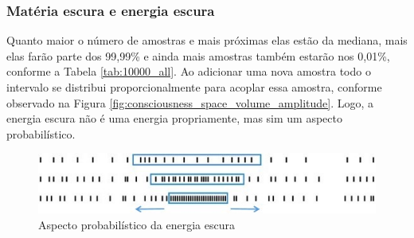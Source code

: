 \subsubsection{Matéria escura e energia escura}
Quanto maior o número de amostras e mais próximas elas estão da mediana, mais elas farão parte dos 99,99\% e ainda mais amostras também estarão nos 0,01\%, conforme a Tabela \ref{tab:10000_all}. Ao adicionar uma nova amostra todo o intervalo se distribui proporcionalmente para acoplar essa amostra, conforme observado na Figura \ref{fig:consciousness_space_volume_amplitude}. Logo, a energia escura não é uma energia propriamente, mas sim um aspecto probabilístico.
	\begin{figure}[H]
	\caption{Aspecto probabilístico da energia escura}
	\label{fig:consciousness_dark_matter_dark_energy}
	\centering
	\includegraphics[scale=.9]{sections/images/consciousness_dark_matter_dark_energy.jpg}
	\end{figure}

